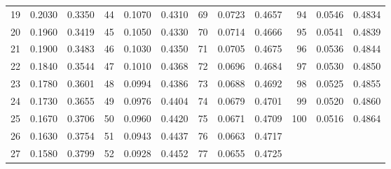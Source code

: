 \begin{table}[ht]
\begin{tabular}{rll|rll|rll|rll}
19 & 0.2030 & 0.3350 & 44 & 0.1070 & 0.4310 & 69 & 0.0723 & 0.4657 & 94 & 0.0546 & 0.4834 \\
20 & 0.1960 & 0.3419 & 45 & 0.1050 & 0.4330 & 70 & 0.0714 & 0.4666 & 95 & 0.0541 & 0.4839 \\
21 & 0.1900 & 0.3483 & 46 & 0.1030 & 0.4350 & 71 & 0.0705 & 0.4675 & 96 & 0.0536 & 0.4844 \\
22 & 0.1840 & 0.3544 & 47 & 0.1010 & 0.4368 & 72 & 0.0696 & 0.4684 & 97 & 0.0530 & 0.4850 \\
23 & 0.1780 & 0.3601 & 48 & 0.0994 & 0.4386 & 73 & 0.0688 & 0.4692 & 98 & 0.0525 & 0.4855 \\
24 & 0.1730 & 0.3655 & 49 & 0.0976 & 0.4404 & 74 & 0.0679 & 0.4701 & 99 & 0.0520 & 0.4860 \\
25 & 0.1670 & 0.3706 & 50 & 0.0960 & 0.4420 & 75 & 0.0671 & 0.4709 & 100 & 0.0516 & 0.4864 \\
26 & 0.1630 & 0.3754 & 51 & 0.0943 & 0.4437 & 76 & 0.0663 & 0.4717 &  & &  \\
27 & 0.1580 & 0.3799 & 52 & 0.0928 & 0.4452 & 77 & 0.0655 & 0.4725 &  & &  \\
\hline
\end{tabular}
\end{table}
